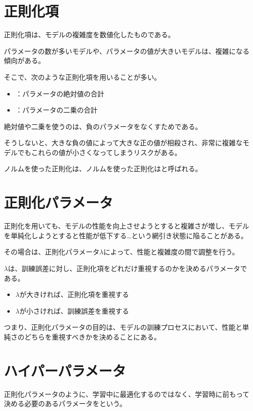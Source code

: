 \documentclass[../../../topic_machine-learning]{subfiles}
\begin{document}
\sectionline
\section{正則化項}

正則化項は、モデルの複雑度を数値化したものである。

パラメータの数が多いモデルや、パラメータの値が大きいモデルは、複雑になる傾向がある。

そこで、次のような正則化項を用いることが多い。
\begin{itemize}
  \item {}：パラメータの絶対値の合計
  \item {}：パラメータの二乗の合計
\end{itemize}

絶対値や二乗を使うのは、負のパラメータをなくすためである。

そうしないと、大きな負の値によって大きな正の値が相殺され、非常に複雑なモデルでもこれらの値が小さくなってしまうリスクがある。

\br

ノルムを使った正則化は、ノルムを使った正則化はと呼ばれる。

\sectionline
\section{正則化パラメータ}

正則化を用いても、モデルの性能を向上させようとすると複雑さが増し、モデルを単純化しようとすると性能が低下する…という網引き状態に陥ることがある。

その場合は、正則化パラメータ$\lambda$によって、性能と複雑度の間で調整を行う。

\br

$\lambda$は、訓練誤差に対し、正則化項をどれだけ重視するのかを決めるパラメータである。

\begin{itemize}
  \item $\lambda$が大きければ、正則化項を重視する
  \item $\lambda$が小さければ、訓練誤差を重視する
\end{itemize}

つまり、正則化パラメータの目的は、モデルの訓練プロセスにおいて、性能と単純さのどちらを重視すべきかを決めることにある。

\sectionline
\section{ハイパーパラメータ}

正則化パラメータのように、学習中に最適化するのではなく、学習時に前もって決める必要のあるパラメータをという。
\end{document}
